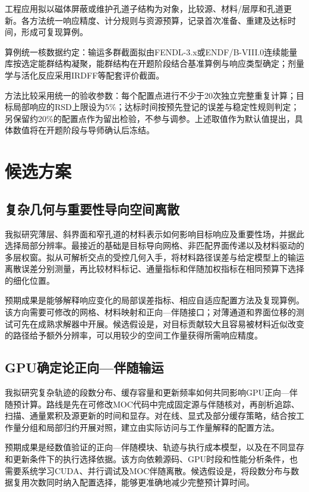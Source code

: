 \documentclass[UTF8, zihao=-4, fontset=none, a4paper]{ctexart}
\begin{document}
工程应用拟以磁体屏蔽或维护孔道子结构为对象，比较源、材料/层厚和孔道更新。各方法统一响应精度、计分规则与资源预算，记录首次准备、重建及达标时间，形成可复现算例。

算例统一核数据约定：输运多群截面拟由FENDL-3.x或ENDF/B-VIII.0连续能量库按选定能群结构凝聚，能群结构在开题阶段结合基准算例与响应类型确定；剂量学与活化反应采用IRDFF等配套评价截面。

方法比较采用统一的验收参数：每个配置点进行不少于20次独立完整重复计算；目标局部响应的RSD上限设为5\%；达标时间按预先登记的误差与稳定性规则判定；另保留约20\%的配置点作为留出检验，不参与调参。上述取值作为默认值提出，具体数值将在开题阶段与导师确认后冻结。

\section{候选方案}\label{sec:6}

\subsection{复杂几何与重要性导向空间离散}

我拟研究薄层、斜界面和窄孔道的材料表示如何影响目标响应及重要性场，并据此选择局部分辨率。最接近的基础是目标导向网格、非匹配界面传递以及材料驱动的多层权窗。拟从可解析交点的受控几何入手，将材料路径误差与给定模型上的输运离散误差分别测量，再比较材料标记、通量指标和伴随加权指标在相同预算下选择的细化位置。

预期成果是能够解释响应变化的局部误差指标、相应自适应配置方法及复现算例。该方向需要可修改的网格、材料映射和正向---伴随接口；对薄通道和界面位移的测试可先在成熟求解器中开展。候选假设是，对目标贡献较大且容易被材料近似改变的路径给予额外分辨率，可以用较少的空间工作量获得所需响应精度。

\subsection{GPU确定论正向---伴随输运}

我拟研究复杂轨迹的段数分布、缓存容量和更新频率如何共同影响GPU正向---伴随预计算。路线是先在可修改MOC代码中完成固定源与伴随核对，再剖析追踪、扫描、通量累积及源更新的时间和显存。对在线、显式及部分缓存策略，结合按工作量分组和局部归约开展对照，建立由实际访问与工作量解释的配置方法。

预期成果是经数值验证的正向---伴随模块、轨迹与执行成本模型，以及在不同显存和更新条件下的执行选择依据。该方向依赖源码、GPU时段和性能分析条件，也需要系统学习CUDA、并行调试及MOC伴随离散。候选假设是，将段数分布与数据复用次数同时纳入配置选择，能够更准确地减少完整预计算时间。
\end{document}
